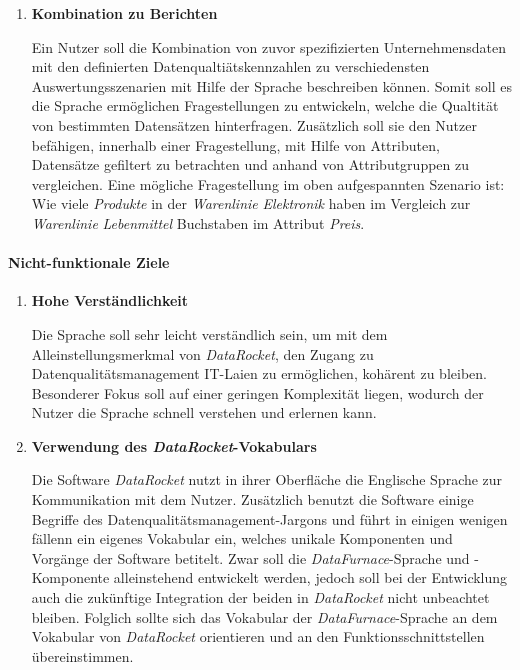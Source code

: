 \documentclass[
  language=german, %
  type=bachelor%
]{isthesis}
\begin{document}
\begin{content}
\begin{enumerate}
      \item \textbf{Kombination zu Berichten}

        Ein Nutzer soll die Kombination von zuvor spezifizierten
        Unternehmensdaten mit den definierten Datenqualtiätskennzahlen zu
        verschiedensten Auswertungsszenarien mit Hilfe der Sprache beschreiben
        können. Somit soll es die Sprache ermöglichen Fragestellungen zu
        entwickeln, welche die Qualtität von bestimmten Datensätzen hinterfragen.
        Zusätzlich soll sie den Nutzer befähigen, innerhalb einer
        Fragestellung, mit Hilfe von Attributen, Datensätze gefiltert zu
        betrachten und anhand von Attributgruppen zu vergleichen. Eine mögliche
        Fragestellung im oben aufgespannten Szenario ist: Wie viele
        \textit{Produkte} in der \textit{Warenlinie} \textit{Elektronik} haben
        im Vergleich zur \textit{Warenlinie} \textit{Lebenmittel} Buchstaben im
        Attribut \textit{Preis}.
    \end{enumerate}

  \paragraph{Nicht-funktionale Ziele}
    \begin{enumerate}
      \item \textbf{Hohe Verständlichkeit}
        
        Die Sprache soll sehr leicht verständlich sein, um mit dem
        Alleinstellungsmerkmal von \textit{DataRocket}, den Zugang zu
        Datenqualitätsmanagement IT-Laien zu ermöglichen, kohärent zu bleiben.
        Besonderer Fokus soll auf einer geringen Komplexität liegen, wodurch
        der Nutzer die Sprache schnell verstehen und erlernen kann.

      \item \textbf{Verwendung des \textit{DataRocket}-Vokabulars}
        
        Die Software \textit{DataRocket} nutzt in ihrer Oberfläche die
        Englische Sprache zur Kommunikation mit dem Nutzer. Zusätzlich benutzt
        die Software einige Begriffe des Datenqualitätsmanagement-Jargons und
        führt in einigen wenigen fällenn ein eigenes Vokabular ein, welches
        unikale Komponenten und Vorgänge der Software betitelt. Zwar soll die
        \textit{DataFurnace}-Sprache und -Komponente alleinstehend entwickelt
        werden, jedoch soll bei der Entwicklung auch die zukünftige Integration
        der beiden in \textit{DataRocket} nicht unbeachtet bleiben. Folglich
        sollte sich das Vokabular der \textit{DataFurnace}-Sprache an dem
        Vokabular von \textit{DataRocket} orientieren und an den
        Funktionsschnittstellen übereinstimmen.
    \end{enumerate}


\end{content}
\end{document}
